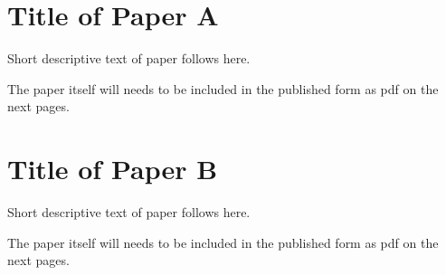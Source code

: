 \documentclass[11pt,openright]{book} %
\begin{document}
\chapter{Title of Paper A}
\label{paper-a}

Short descriptive text of paper follows here.

The paper itself will needs to be included in the published form as pdf on the next pages.

\chapter{Title of Paper B}
\label{paper-b}
Short descriptive text of paper follows here.

The paper itself will needs to be included in the published form as pdf on the next pages.
\end{document}

